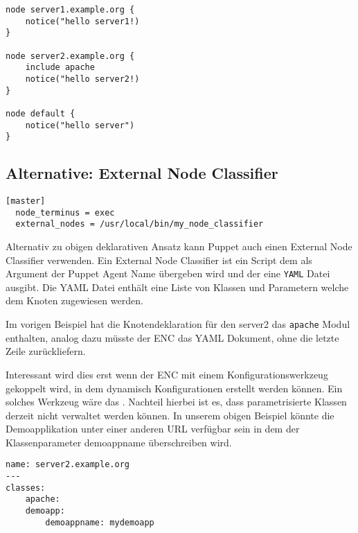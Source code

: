 \documentclass[12pt,a4paper,ngerman]{article}
\begin{document}

\begin{lstlisting}[language=puppet,caption=Node Definitionen in /etc/puppet/manifests/site.pp, label=puppet-node-classifier]
node server1.example.org {
    notice("hello server1!)
}

node server2.example.org {
    include apache
    notice("hello server2!)
}

node default {
    notice("hello server")
}

\end{lstlisting}  

\subsection{Alternative: External Node Classifier}
     
\begin{lstlisting}[caption=External Node Classifier Konfiguration des Puppet Master, label=puppet-enc-config]
[master]
  node_terminus = exec
  external_nodes = /usr/local/bin/my_node_classifier
\end{lstlisting} 

Alternativ zu obigen deklarativen Ansatz kann Puppet auch einen External Node Classifier verwenden.  Ein External Node Classifier ist ein Script dem als Argument der Puppet Agent Name übergeben wird und der eine \lstinline$YAML$ Datei ausgibt. Die YAML Datei enthält eine Liste von Klassen und Parametern welche dem Knoten zugewiesen werden.  

Im vorigen Beispiel hat die Knotendeklaration für den server2 das \lstinline$apache$ Modul enthalten, analog dazu müsste der ENC das YAML Dokument, ohne die letzte Zeile zurückliefern.  

Interessant wird dies erst wenn der ENC mit einem Konfigurationswerkzeug gekoppelt wird, in dem dynamisch Konfigurationen erstellt werden können. Ein solches Werkzeug wäre das \cite{puppetdashboard}. Nachteil hierbei ist es, dass parametrisierte Klassen derzeit nicht verwaltet werden können. In unserem obigen Beispiel könnte die Demoapplikation unter einer anderen URL verfügbar sein in dem der Klassenparameter demoappname überschreiben wird.


\begin{lstlisting}[caption=ENC's YAML mit Klassenparameter , label=puppet-enc-yaml-param]
name: server2.example.org
---
classes: 
    apache:
    demoapp: 
        demoappname: mydemoapp
\end{lstlisting} 
\end{document}
